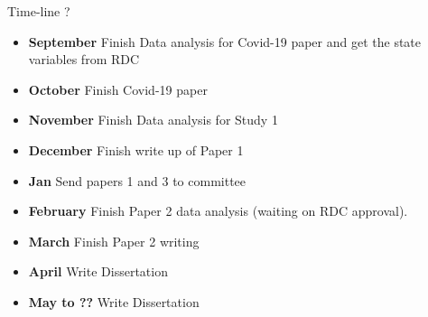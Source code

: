 \documentclass[t, hyperref={colorlinks=true}, compress]{beamer}
\begin{document}
\begin{frame}{Time-line ?}
\begin{itemize}
\footnotesize
\item \textbf{September} Finish Data analysis for Covid-19 paper and get the state variables from RDC
\bigskip
\item \textbf{October} Finish Covid-19 paper
\bigskip
\item \textbf{November} Finish Data analysis for Study 1
\bigskip
\item \textbf{December} Finish write up of Paper 1
\bigskip
\item \textbf{Jan}  Send papers 1 and 3 to committee
\bigskip
\item \textbf{February}  Finish Paper 2 data analysis (waiting on RDC approval). 
\bigskip
\item \textbf{March} Finish Paper 2 writing
\bigskip
\item	\textbf{April } Write Dissertation
\bigskip
\item	\textbf{May to ??} Write Dissertation
\end{itemize}
\end{frame}
\end{document}
